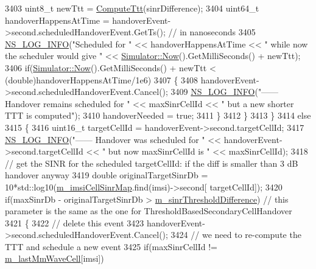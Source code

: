 \begin{DoxyCode}
3403           uint8\_t newTtt = \hyperlink{classns3_1_1LteEnbRrc_a10f21eb00cdcfe24bcbcd8cddd823029}{ComputeTtt}(sinrDifference);
3404           uint64\_t handoverHappensAtTime = handoverEvent->second.scheduledHandoverEvent.GetTs(); \textcolor{comment}{// in
       nanoseconds}
3405           \hyperlink{group__logging_gafbd73ee2cf9f26b319f49086d8e860fb}{NS\_LOG\_INFO}(\textcolor{stringliteral}{"Scheduled for "} << handoverHappensAtTime << \textcolor{stringliteral}{" while now the scheduler
       would give "} << \hyperlink{classns3_1_1Simulator_ac3178fa975b419f7875e7105be122800}{Simulator::Now}().GetMilliSeconds() + newTtt);
3406           \textcolor{keywordflow}{if}(\hyperlink{classns3_1_1Simulator_ac3178fa975b419f7875e7105be122800}{Simulator::Now}().GetMilliSeconds() + newTtt < (\textcolor{keywordtype}{double})handoverHappensAtTime/1e6)
3407           \{
3408             handoverEvent->second.scheduledHandoverEvent.Cancel();
3409             \hyperlink{group__logging_gafbd73ee2cf9f26b319f49086d8e860fb}{NS\_LOG\_INFO}(\textcolor{stringliteral}{"------ Handover remains scheduled for "} << maxSinrCellId << \textcolor{stringliteral}{" but a new
       shorter TTT is computed"});
3410             handoverNeeded = \textcolor{keyword}{true};
3411           \}  
3412         \}
3413       \}
3414       \textcolor{keywordflow}{else}
3415       \{
3416         uint16\_t targetCellId = handoverEvent->second.targetCellId;
3417         \hyperlink{group__logging_gafbd73ee2cf9f26b319f49086d8e860fb}{NS\_LOG\_INFO}(\textcolor{stringliteral}{"------ Handover was scheduled for "} << handoverEvent->second.targetCellId 
      << \textcolor{stringliteral}{" but now maxSinrCellId is "} << maxSinrCellId);
3418         \textcolor{comment}{//  get the SINR for the scheduled targetCellId: if the diff is smaller than 3 dB handover anyway}
3419         \textcolor{keywordtype}{double} originalTargetSinrDb = 10*std::log10(\hyperlink{classns3_1_1LteEnbRrc_a72b3ce5c1f8495e96bfc0f384ecf3a96}{m\_imsiCellSinrMap}.find(imsi)->second[
      targetCellId]);
3420         \textcolor{keywordflow}{if}(maxSinrDb - originalTargetSinrDb > \hyperlink{classns3_1_1LteEnbRrc_aef56a65c644f6ed3c5f28a540ded624f}{m\_sinrThresholdDifference}) \textcolor{comment}{// this
       parameter is the same as the one for ThresholdBasedSecondaryCellHandover}
3421         \{
3422           \textcolor{comment}{// delete this event}
3423           handoverEvent->second.scheduledHandoverEvent.Cancel();
3424           \textcolor{comment}{// we need to re-compute the TTT and schedule a new event}
3425           \textcolor{keywordflow}{if}(maxSinrCellId != \hyperlink{classns3_1_1LteEnbRrc_a0d7b04f0383b0dc3f6a7360b87cbaeee}{m\_lastMmWaveCell}[imsi])

\end{DoxyCode}
